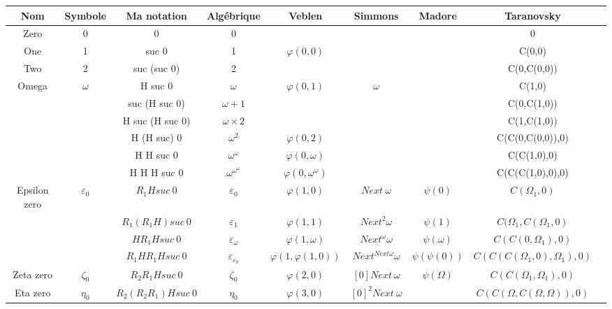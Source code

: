 \documentclass[8pt]{article}
\begin{document}
\begin{tabular}{|c|c|c|c|c|c|c|c|c|}
\hline
Nom		& Symbole		& Ma notation		& Algébrique			& Veblen			& Simmons			& Madore				& Taranovsky 			\\
\hline
Zero		& 0			& 0			& 0				& 				& 				& 					& 0				\\ \hline
One		& 1			& suc 0			& 1				& \(\varphi(0,0)\)		& 				& 					& C(0,0)			\\ \hline
Two		& 2			& suc (suc 0)		& 2				& 				& 				& 					& C(0,C(0,0))			\\ \hline
Omega		& \(\omega\)		& H suc 0		& \(\omega\)			& \(\varphi(0,1)\)		& \(\omega\)			& 					& C(1,0)			\\ \hline
		& 			& suc (H suc 0)		& \(\omega+1\)			& 				& 				& 					& C(0,C(1,0))			\\ \hline
		&			& H suc (H suc 0)	& \(\omega\times2\)		&				& 				& 					& C(1,C(1,0))			\\ \hline
		&			& H (H suc) 0		& \(\omega^2\)			& \(\varphi(0,2)\)		& 				& 					& C(C(0,C(0,0)),0)		\\ \hline
		&			& H H suc 0		& \(\omega^\omega\)		& \(\varphi(0,\omega)\)		& 				& 					& C(C(1,0),0)			\\ \hline
		&			& H H H suc 0		& \(\omega^{\omega^\omega}\)	& \(\varphi(0,\omega^\omega)\)	&				&					& C(C(C(1,0),0),0)		\\ \hline
Epsilon zero	& \(\varepsilon_0\)	& \(R_1 H suc\ 0\)	& \(\varepsilon_0\)		& \(\varphi(1,0)\)		& \(Next\ \omega\)		& \(\psi(0)\)				& \(C(\Omega_1,0)\)		\\ \hline
		& 			& \(R_1 (R_1 H) suc\ 0\)& \(\varepsilon_1\)		& \(\varphi(1,1)\)		& \(Next^2 \omega\)	& \(\psi(1)\)				& \(C(\Omega_1,C(\Omega_1,0)\)	\\ \hline
		& 			& \(H R_1 H suc\ 0\)	& \(\varepsilon_\omega\)	& \(\varphi(1,\omega)\) 	& \(Next^\omega \omega\) & \(\psi(\omega)\)			& \(C(C(0,\Omega_1),0)\)	\\ \hline
		& 			& \(R_1 H R_1 H suc\ 0\)&\(\varepsilon_{\varepsilon_0}\)& \(\varphi(1,\varphi(1,0))\)	& \(Next^{Next \omega} \omega \) & \(\psi(\psi(0))\)			& \(C(C(C(\Omega_1,0),\Omega_1),0)\)\\ \hline
Zeta zero	& \(\zeta_0\)		& \(R_2 R_1 H suc\ 0\)	& \(\zeta_0\)			& \(\varphi(2,0)\)		& \([0] Next\ \omega\)		& \(\psi(\Omega)\)			& \(C(C(\Omega_1,\Omega_1),0)\)	\\ \hline
Eta zero	& \(\eta_0\)		& \(R_2 (R_2 R_1) H suc\ 0\)& \(\eta_0\)			& \(\varphi(3,0)\)		& \([0]^2 Next\ \omega\) 	&					& \(C(C(\Omega,C(\Omega,\Omega)),0)\) \\ \hline

\end{tabular}
\end{document}
